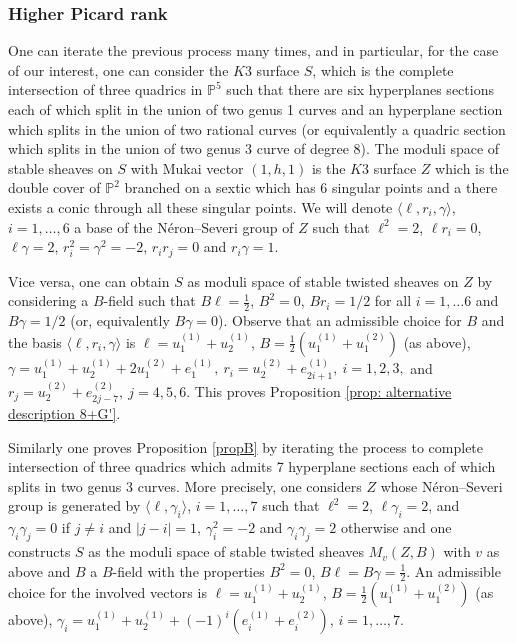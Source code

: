 \documentclass{amsart}
\theoremstyle{definition}
\numberwithin{equation}{section}
\numberwithin{equation}{section} \theoremstyle{definition}
\begin{document}
\subsubsection{Higher Picard rank}
One can iterate the previous process many times, and in particular, for the case of our interest, one can consider the $K3$ surface $S$, which is the complete intersection of three quadrics in $\mathbb{P}^5$ such that there are six hyperplanes sections each of  which split in the union of two genus 1 curves and an hyperplane section which splits in the union of two rational curves (or equivalently a quadric section which splits in the union of two genus 3 curve of degree 8). 
The moduli space of stable sheaves  on $S$ with Mukai vector $(1,h,1)$ is the $K3$ surface $Z$ which is the double cover of $\mathbb{P}^2$ branched on a sextic which has 6 singular points and a there exists a conic through all these singular points. We will denote $\langle \ell,r_i,\gamma\rangle$, $i=1,\ldots, 6$ a base of the N\'eron--Severi group of $Z$ such that $\ell^2=2$, $\ell r_i=0$, $\ell \gamma=2$, $r_i^2=\gamma^2=-2$, $r_ir_j=0$ and $r_i\gamma=1$. 

Vice versa, one can obtain $S$ as moduli space of stable twisted sheaves on $Z$ by considering a $B$-field such that $B\ell=\frac{1}{2}$, $B^2=0$, $Br_i=1/2$ for all $i=1,\ldots 6$ and $B\gamma=1/2$ (or, equivalently $B\gamma=0$). Observe that an admissible choice for $B$ and the basis $\langle \ell,r_i,\gamma\rangle$ is $\ell=u_1^{(1)}+u_2^{(1)}$, $B=\frac{1}{2}(u_1^{(1)}+u_1^{(2)})$ (as above), $\gamma=u_1^{(1)}+u_2^{(1)}+2u_1^{(2)}+e_1^{(1)},\ r_i=u_2^{(2)}+e_{2i+1}^{(1)},\ i=1,2,3,$ and $r_j=u_2^{(2)}+e_{2j-7}^{(2)},\ j=4,5,6.$  This proves Proposition \ref{prop: alternative description 8+G'}.

Similarly one proves Proposition \ref{propB} by iterating the process to complete intersection of three quadrics which admits 7 hyperplane sections each of which splits in two genus 3 curves. More precisely, one considers $Z$ whose N\'eron--Severi group is generated by $\langle \ell,\gamma_i\rangle$, $i=1,\ldots, 7$ such that $\ell^2=2$, $\ell\gamma_i=2$, and $\gamma_i\gamma_j=0$ if $j\neq i$ and $|j-i|= 1$, $\gamma_i^2=-2$ and $\gamma_i\gamma_j=2$ otherwise and one constructs $S$ as the moduli space of stable twisted sheaves $M_v(Z,B)$ with $v$ as above and $B$ a $B$-field with the properties $B^2=0$, $B\ell=B\gamma=\frac{1}{2}$. An admissible choice for the involved vectors is  $\ell=u_1^{(1)}+u_2^{(1)}$, $B=\frac{1}{2}(u_1^{(1)}+u_1^{(2)})$ (as above), $\gamma_i=u_1^{(1)}+u_2^{(1)}+(-1)^i\left(e_i^{(1)}+e_i^{(2)}\right)$, $i=1,\ldots, 7$.
\end{document}
